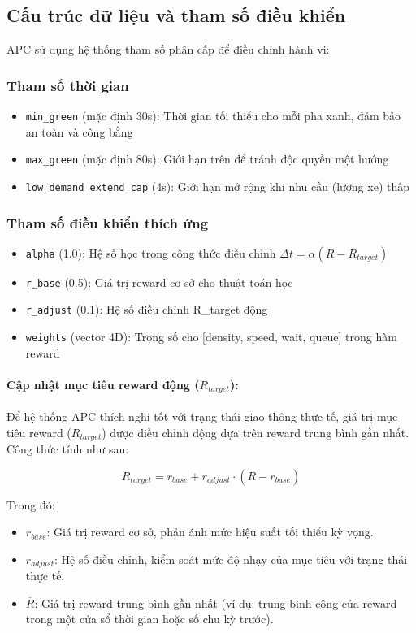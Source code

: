 \subsection{Cấu trúc dữ liệu và tham số điều khiển}

APC sử dụng hệ thống tham số phân cấp để điều chỉnh hành vi:

\subsubsection{Tham số thời gian}
\begin{itemize}
    \item \texttt{min\_green} (mặc định 30s): Thời gian tối thiểu cho mỗi pha xanh, đảm bảo an toàn và công bằng
    \item \texttt{max\_green} (mặc định 80s): Giới hạn trên để tránh độc quyền một hướng
    \item \texttt{low\_demand\_extend\_cap} (4s): Giới hạn mở rộng khi nhu cầu (lượng xe) thấp
\end{itemize}

\subsubsection{Tham số điều khiển thích ứng}
\begin{itemize}
    \item \texttt{alpha} (1.0): Hệ số học trong công thức điều chỉnh $\Delta t = \alpha(R - R_{target})$
    \item \texttt{r\_base} (0.5): Giá trị reward cơ sở cho thuật toán học
    \item \texttt{r\_adjust} (0.1): Hệ số điều chỉnh R\_target động
    \item \texttt{weights} (vector 4D): Trọng số cho [density, speed, wait, queue] trong hàm reward
\end{itemize}

\paragraph{Cập nhật mục tiêu reward động (\(R_{target}\)):}
Để hệ thống APC thích nghi tốt với trạng thái giao thông thực tế, giá trị mục tiêu reward (\(R_{target}\)) được điều chỉnh động dựa trên reward trung bình gần nhất. Công thức tính như sau:

\[
R_{target} = r_{base} + r_{adjust} \cdot (\overline{R} - r_{base})
\]

Trong đó:
\begin{itemize}
    \item \(r_{base}\): Giá trị reward cơ sở, phản ánh mức hiệu suất tối thiểu kỳ vọng.
    \item \(r_{adjust}\): Hệ số điều chỉnh, kiểm soát mức độ nhạy của mục tiêu với trạng thái thực tế.
    \item \(\overline{R}\): Giá trị reward trung bình gần nhất (ví dụ: trung bình cộng của reward trong một cửa sổ thời gian hoặc số chu kỳ trước).
\end{itemize}

